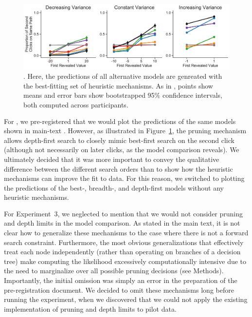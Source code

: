 \begin{figure}[t!]
    \centering
    \includegraphics[width=\textwidth]{figs/planning/second_click_alt.pdf}
    \caption{. Here, the predictions of all alternative models are genreated with the best-fitting set of heuristic mechanisms. As in , points show means and error bars show bootstrapped 95\% confidence intervals, both computed across participants.
    }
    \label{fig:second_click_alt}
\end{figure}

For , we pre-registered that we would plot the predictions of the same models shown in main-text . However, as illustrated in Figure~\ref{fig:second_click_alt}, the pruning mechanism allows depth-first search to closely mimic best-first search on the second click (although not necessarily on later clicks, as the model comparison reveals). We ultimately decided that it was more important to convey the qualitative difference between the different search orders than to show how the heuristic mechanisms can improve the fit to data. For this reason, we switched to plotting the predictions of the best-, breadth-, and depth-first models without any heuristic mechanisms.

For Experiment~3, we neglected to mention that we would not consider pruning and depth limits in the model comparison. As stated in the main text, it is not clear how to generalize these mechanisms to the case where there is not a forward search constraint. Furthermore, the most obvious generalizations that effectively treat each node independently (rather than operating on branches of a decision tree) make computing the likelihood excessively computationally intensive due to the need to marginalize over all possible pruning decisions (see Methods). Importantly, the initial omission was simply an error in the preparation of the pre-registration document. We decided to omit these mechanisms long before running the experiment, when we discovered that we could not apply the existing implementation of pruning and depth limits to pilot data.

